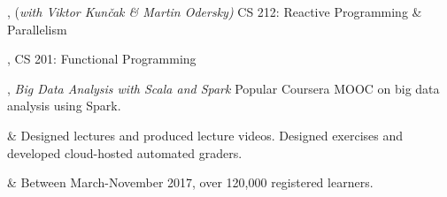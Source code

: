 \documentclass[9pt]{article}
\begin{document}
, {(\em with Viktor Kun\v cak \& Martin Odersky)} 
\newline\noindent CS 212: Reactive Programming \& Parallelism 
\bigskip

, 
\newline\noindent CS 201: Functional Programming 
\bigskip



\medskip
{}

, {\em Big Data Analysis with Scala and Spark} 
\newline\noindent Popular Coursera MOOC on big data analysis using Spark. 
\smallskip
\begin{easylist}[itemize]
& Designed lectures and produced lecture videos. Designed exercises
\newline and developed cloud-hosted automated graders.

& Between March-November 2017, over 120,000 registered learners.
\end{easylist}

%
\bigskip


\end{document}
